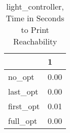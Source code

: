 \begin{table}
\caption{light\_controller, Time in Seconds to Print Reachability}
\label{light_controller_states_time}
\begin{tabular}{ll}
\toprule
 & 1 \\
\midrule
no\_opt & 0.00 \\
last\_opt & 0.00 \\
first\_opt & 0.01 \\
full\_opt & 0.00 \\
\bottomrule
\end{tabular}
\end{table}
